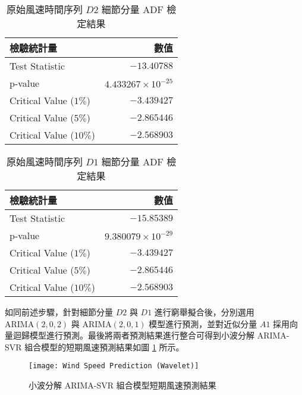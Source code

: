 \begin{table}[htbp]
  \centering
  \caption[原始風速時間序列 $D2$ 細節分量 ADF 檢定結果]{原始風速時間序列 $D2$ 細節分量 ADF 檢定結果}
  \begin{tabular}{lr}
    \toprule
    \textbf{檢驗統計量} & \textbf{數值}     \\
    \midrule
    Test Statistic          & $-13.40788$  \\
    p-value                 & $4.433267 \times 10^{-25}$    \\
    Critical Value ($1\%$)  & $-3.439427$   \\
    Critical Value ($5\%$)  & $-2.865446$   \\
    Critical Value ($10\%$) & $-2.568903$   \\
    \bottomrule
  \end{tabular}
  \label{table: D2 ADF Result}
\end{table}

\begin{table}[htbp]
  \centering
  \caption[原始風速時間序列 $D1$ 細節分量 ADF 檢定結果]{原始風速時間序列 $D1$ 細節分量 ADF 檢定結果}
  \begin{tabular}{lr}
    \toprule
    \textbf{檢驗統計量} & \textbf{數值}     \\
    \midrule
    Test Statistic          & $-15.85389$  \\
    p-value                 & $9.380079 \times 10^{-29}$    \\
    Critical Value ($1\%$)  & $-3.439427$   \\
    Critical Value ($5\%$)  & $-2.865446$   \\
    Critical Value ($10\%$) & $-2.568903$   \\
    \bottomrule
  \end{tabular}
  \label{table: D1 ADF Result}
\end{table}

如同前述步驟，針對細節分量 $D2$ 與 $D1$ 進行窮舉擬合後，分別選用 $\text{ARIMA} (2, 0, 2)$ 與 $\text{ARIMA} (2, 0, 1)$ 模型進行預測，並對近似分量 $A1$ 採用向量迴歸模型進行預測。最後將兩者預測結果進行整合可得到小波分解 ARIMA-SVR 組合模型的短期風速預測結果如圖 \ref{figure: Wind Speed Prediction Wavelet} 所示。

\begin{figure}[htbp]
  \centering
  \texttt{[image: Wind Speed Prediction (Wavelet)]}
  \caption{小波分解 ARIMA-SVR 組合模型短期風速預測結果}
  \label{figure: Wind Speed Prediction Wavelet}
\end{figure}


